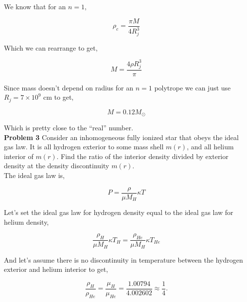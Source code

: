 \documentclass[12pt]{article}
\begin{document}
 \noindent We know that for an $n=1$,
 
\begin{equation}
\rho_c = \frac{\pi M}{4 R_j^3} 
\end{equation}

\noindent Which we can rearrange to get, 

\begin{equation}
M = \frac{4 \rho R_j^3}{\pi}
\end{equation}

\noindent Since mass doesn't depend on radius for an $n=1$ polytrope we can just use $R_j = 7 \times 10^9$ cm to get,

\begin{equation}
M =  0.12 M_{\odot}
\end{equation} 

\noindent Which is pretty close to the ``real'' number. \\

\noindent \textbf{Problem 3} Consider an inhomogeneous fully ionized star that obeys the ideal gas law. It is all hydrogen exterior to some mass shell $m\left(r\right)$, and all helium interior of $m\left(r\right)$. Find the ratio of the interior density divided by exterior density at the density discontinuity $m\left(r\right)$. \\

\noindent The ideal gas law is,

\begin{equation}
P = \frac{\rho}{\mu M_H} \kappa T 
\end{equation}

\noindent Let's set the ideal gas law for hydrogen density equal to the ideal gas law for helium density,

\begin{equation}
 \frac{\rho_{H}}{\mu M_H} \kappa T_{H}  =  \frac{\rho_{He}}{\mu M_H} \kappa T_{He} 
\end{equation}

\noindent And let's assume there is no discontinuity in temperature between the hydrogen exterior and helium interior to get,

\begin{equation}
\frac{\rho_H}{\rho_{He}} = \frac{\mu_H}{\mu_{He}} = \frac{1.00794}{4.002602} \approx \frac{1}{4}.
\end{equation}

  
\end{document}
